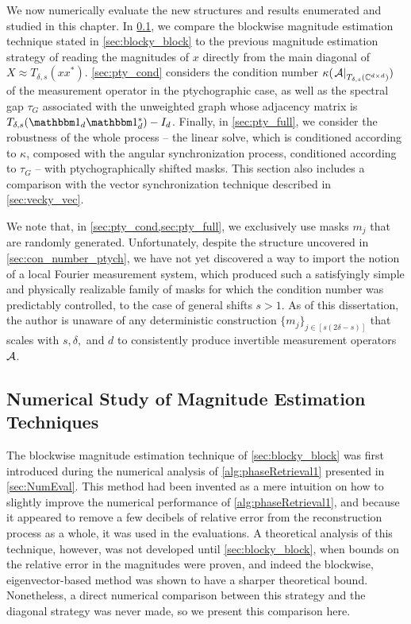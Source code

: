 We now numerically evaluate the new structures and results enumerated and studied in this chapter.  In \cref{sec:pn_blocky}, we compare the blockwise magnitude estimation technique stated in \cref{sec:blocky_block} to the previous magnitude estimation strategy of reading the magnitudes of $x$ directly from the main diagonal of $X \approx T_{\delta, s}(x x^*)$.  \cref{sec:pty_cond} considers the condition number $\kappa(\left.\mathcal{A}\right|_{T_{\delta, s}(\mathbb{C}^{d \times d})})$ of the measurement operator in the ptychographic case, as well as the spectral gap $\tau_G$ associated with the unweighted graph whose adjacency matrix is $T_{\delta, s}(\one_d \one_d^*) - I_d$.  Finally, in \cref{sec:pty_full}, we consider the robustness of the whole process -- the linear solve, which is conditioned according to $\kappa$, composed with the angular synchronization process, conditioned according to $\tau_G$ -- with ptychographically shifted masks.  This section also includes a comparison with the vector synchronization technique described in \cref{sec:vecky_vec}.

We note that, in \cref{sec:pty_cond,sec:pty_full}, we exclusively use masks $m_j$ that are randomly generated.  Unfortunately, despite the structure uncovered in \cref{sec:con_number_ptych}, we have not yet discovered a way to import the notion of a local Fourier measurement system, which produced such a satisfyingly simple and physically realizable family of masks for which the condition number was predictably controlled, to the case of general shifts $s > 1$.  As of this dissertation, the author is unaware of any deterministic construction $\{m_j\}_{j \in [s(2 \delta - s)]}$ that scales with $s, \delta,$ and $d$ to consistently produce invertible measurement operators $\mathcal{A}$.

\subsection{Numerical Study of Magnitude Estimation Techniques}
\label{sec:pn_blocky}
The blockwise magnitude estimation technique of \cref{sec:blocky_block} was first introduced during the numerical analysis of \cref{alg:phaseRetrieval1} presented in \cref{sec:NumEval}.  This method had been invented as a mere intuition on how to slightly improve the numerical performance of \cref{alg:phaseRetrieval1}, and because it appeared to remove a few decibels of relative error from the reconstruction process as a whole, it was used in the evaluations.  A theoretical analysis of this technique, however, was not developed until \cref{sec:blocky_block}, when bounds on the relative error in the magnitudes were proven, and indeed the blockwise, eigenvector-based method was shown to have a sharper theoretical bound.  Nonetheless, a direct numerical comparison between this strategy and the diagonal strategy was never made, so we present this comparison here.

